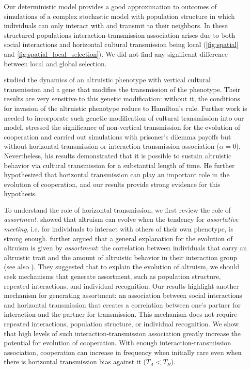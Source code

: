\documentclass[12pt]{extarticle}
\begin{document}
Our deterministic model provides a good approximation to outcomes of simulations of a complex stochastic model with population structure in which individuals can only interact with and transmit to their neighbors.
In these structured populations interaction-transmission association arises due to both social interactions and horizontal cultural transmission being local (\autoref{fig:spatial} and \autoref{fig:spatial_local_selection}).
We did not find any significant difference between local and global selection. %


\citet{feldman1985gene} studied the dynamics of an altruistic phenotype with vertical cultural transmission and a gene that modifies the transmission of the phenotype. Their results are very sensitive to this genetic modification: without it, the conditions for invasion of the altruistic phenotype reduce to Hamilton's rule.
Further work is needed to incorporate such genetic modification of cultural transmission into our model. %
\citet{woodcock2006significance} stressed the significance of non-vertical transmission for the evolution of cooperation and
carried out simulations with prisoner's dilemma payoffs but without horizontal transmission or interaction-transmission association ($\alpha=0$).
Nevertheless, his results demonstrated that it is possible to sustain altruistic behavior via cultural transmission for a substantial length of time.
He further hypothesized that horizontal transmission can play an important role in the evolution of cooperation, and our results provide strong evidence for this hypothesis. 

To understand the role of horizontal transmission, we first review the role of \emph{assortment}.
\citet{Eshel1982} showed that altruism can evolve when the tendency for \emph{assortative meeting}, i.e. for individuals to interact with others of their own phenotype, is strong enough.
\citet{Fletcher2009assortment}  further argued that a general explanation for the evolution of altruism is given by \emph{assortment}: the correlation between individuals that carry an altruistic trait and the amount of altruistic behavior in their interaction group (see also \citet{Bijma2010assortment}).
They suggested that to explain the evolution of altruism, we should seek mechanisms that generate  assortment, such as population structure, repeated interactions, and individual recognition.
Our results highlight another mechanism for generating assortment: an association between social interactions and horizontal transmission that creates a correlation between one's partner for interaction and the partner for transmission.
This mechanism does not require repeated interactions, population structure, or individual recognition.
We show that high levels of such interaction-transmission association greatly increase the potential for evolution of cooperation.
With enough interaction-transmission association, cooperation can increase in frequency when initially rare even when there is horizontal transmission bias against it ($T_A<T_B$).
\end{document}

